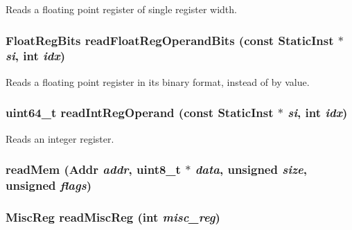 \label{classExecContext_a717c88c8c56d79c9ed554ba5992bd8c3}
Reads a floating point register of single register width. \hypertarget{classExecContext_a39d93624e4481f4a210f2c46ea6b15b0}{
\subsubsection[{readFloatRegOperandBits}]{\setlength{\rightskip}{0pt plus 5cm}FloatRegBits readFloatRegOperandBits (const {\bf StaticInst} $\ast$ {\em si}, \/  int {\em idx})}}
\label{classExecContext_a39d93624e4481f4a210f2c46ea6b15b0}
Reads a floating point register in its binary format, instead of by value. \hypertarget{classExecContext_a9e7b0a4d5373c48902425c9456b19e7e}{
\subsubsection[{readIntRegOperand}]{\setlength{\rightskip}{0pt plus 5cm}uint64\_\-t readIntRegOperand (const {\bf StaticInst} $\ast$ {\em si}, \/  int {\em idx})}}
\label{classExecContext_a9e7b0a4d5373c48902425c9456b19e7e}
Reads an integer register. \hypertarget{classExecContext_a66191b2d8a45050b7df3c3efa7bb07c6}{
\subsubsection[{readMem}]{ readMem ({\bf Addr} {\em addr}, \/  uint8\_\-t $\ast$ {\em data}, \/  unsigned {\em size}, \/  unsigned {\em flags})}}
\label{classExecContext_a66191b2d8a45050b7df3c3efa7bb07c6}
\hypertarget{classExecContext_a5a8c6c487e8da143d26188258b04f1cc}{
\subsubsection[{readMiscReg}]{\setlength{\rightskip}{0pt plus 5cm}MiscReg readMiscReg (int {\em misc\_\-reg})}}
